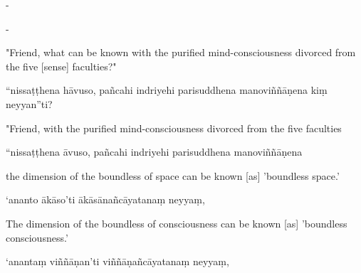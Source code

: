 \begin{samepage}
\begin{leftcolumn*}
-
\end{leftcolumn*}

\begin{rightcolumn}
-
\end{rightcolumn}
\end{samepage}

\begin{samepage}
\begin{leftcolumn*}
"Friend, what can be known with the purified mind-consciousness divorced from the five [sense] faculties?"
\end{leftcolumn*}

\begin{rightcolumn}
“nissaṭṭhena hāvuso, pañcahi indriyehi parisuddhena manoviññāṇena kiṃ neyyan”ti?
\end{rightcolumn}
\end{samepage}

\begin{samepage}
\begin{leftcolumn*}
"Friend, with the purified mind-consciousness divorced from the five faculties
\end{leftcolumn*}

\begin{rightcolumn}
“nissaṭṭhena āvuso, pañcahi indriyehi parisuddhena manoviññāṇena
\end{rightcolumn}
\end{samepage}

\begin{samepage}
\begin{leftcolumn*}
the dimension of the boundless of space can be known [as] 'boundless space.'
\end{leftcolumn*}

\begin{rightcolumn}
‘ananto ākāso’ti ākāsānañcāyatanaṃ neyyaṃ,
\end{rightcolumn}
\end{samepage}

\begin{samepage}
\begin{leftcolumn*}
The dimension of the boundless of consciousness can be known [as] 'boundless consciousness.'
\end{leftcolumn*}

\begin{rightcolumn}
‘anantaṃ viññāṇan’ti viññāṇañcāyatanaṃ neyyaṃ,
\end{rightcolumn}
\end{samepage}

